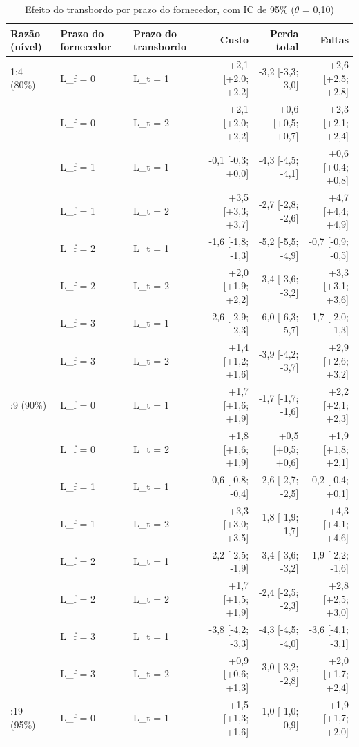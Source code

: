 \begin{table}[htbp]
\centering
\small
\caption{Efeito do transbordo por prazo do fornecedor, com IC de 95\% ($\theta$ = 0,10)}
\label{tab:tbr_diferencas}
\begin{tabular}{lllrrr}
\toprule
Razão (nível) & Prazo do fornecedor & Prazo do transbordo & Custo & Perda total & Faltas \\
\midrule
1:4 (80\%) & L\_f = 0 & L\_t = 1 & +2,1 [+2,0; +2,2] & -3,2 [-3,3; -3,0] & +2,6 [+2,5; +2,8] \\
 & L\_f = 0 & L\_t = 2 & +2,1 [+2,0; +2,2] & +0,6 [+0,5; +0,7] & +2,3 [+2,1; +2,4] \\
 & L\_f = 1 & L\_t = 1 & -0,1 [-0,3; +0,0] & -4,3 [-4,5; -4,1] & +0,6 [+0,4; +0,8] \\
 & L\_f = 1 & L\_t = 2 & +3,5 [+3,3; +3,7] & -2,7 [-2,8; -2,6] & +4,7 [+4,4; +4,9] \\
 & L\_f = 2 & L\_t = 1 & -1,6 [-1,8; -1,3] & -5,2 [-5,5; -4,9] & -0,7 [-0,9; -0,5] \\
 & L\_f = 2 & L\_t = 2 & +2,0 [+1,9; +2,2] & -3,4 [-3,6; -3,2] & +3,3 [+3,1; +3,6] \\
 & L\_f = 3 & L\_t = 1 & -2,6 [-2,9; -2,3] & -6,0 [-6,3; -5,7] & -1,7 [-2,0; -1,3] \\
 & L\_f = 3 & L\_t = 2 & +1,4 [+1,2; +1,6] & -3,9 [-4,2; -3,7] & +2,9 [+2,6; +3,2] \\
\addlinespace
1:9 (90\%) & L\_f = 0 & L\_t = 1 & +1,7 [+1,6; +1,9] & -1,7 [-1,7; -1,6] & +2,2 [+2,1; +2,3] \\
 & L\_f = 0 & L\_t = 2 & +1,8 [+1,6; +1,9] & +0,5 [+0,5; +0,6] & +1,9 [+1,8; +2,1] \\
 & L\_f = 1 & L\_t = 1 & -0,6 [-0,8; -0,4] & -2,6 [-2,7; -2,5] & -0,2 [-0,4; +0,1] \\
 & L\_f = 1 & L\_t = 2 & +3,3 [+3,0; +3,5] & -1,8 [-1,9; -1,7] & +4,3 [+4,1; +4,6] \\
 & L\_f = 2 & L\_t = 1 & -2,2 [-2,5; -1,9] & -3,4 [-3,6; -3,2] & -1,9 [-2,2; -1,6] \\
 & L\_f = 2 & L\_t = 2 & +1,7 [+1,5; +1,9] & -2,4 [-2,5; -2,3] & +2,8 [+2,5; +3,0] \\
 & L\_f = 3 & L\_t = 1 & -3,8 [-4,2; -3,3] & -4,3 [-4,5; -4,0] & -3,6 [-4,1; -3,1] \\
 & L\_f = 3 & L\_t = 2 & +0,9 [+0,6; +1,3] & -3,0 [-3,2; -2,8] & +2,0 [+1,7; +2,4] \\
\addlinespace
1:19 (95\%) & L\_f = 0 & L\_t = 1 & +1,5 [+1,3; +1,6] & -1,0 [-1,0; -0,9] & +1,9 [+1,7; +2,0] \\

\end{tabular}
\end{table}

